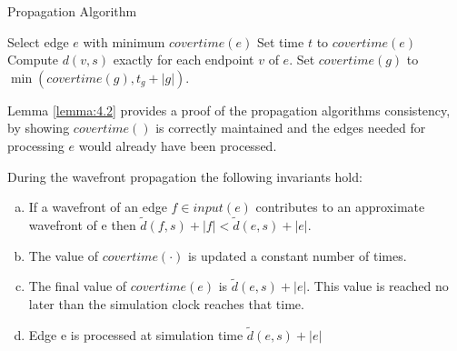 \begin{algorithm}[H]
	\caption{Propagation Algorithm} \label{algorithm:propagationalgorithm}
	\begin{algorithmic}[1]
        	\State Select edge $e$ with minimum $covertime(e)$
            \State Set time $t$ to $covertime(e)$
            \State {}
            \State Compute $d(v,s)$ exactly for each endpoint $v$ of $e$.
           		\State {}
                \State Set $covertime(g)$ to $\min(covertime(g), t_g + |g|)$.
            \EndFor
        \EndWhile
	\end{algorithmic} 
\end{algorithm}

Lemma \ref{lemma:4.2} provides a proof of the propagation algorithms consistency, by showing 
$covertime()$ is correctly maintained and the edges needed for processing $e$ would already have 
been processed. 

\begin{Lemma}\label{lemma:4.2}
During the wavefront propagation the following invariants hold:

\begin{enumerate}[(a)]
	\item If a wavefront of an edge $f \in input(e)$ contributes to an
	approximate wavefront of e then $\tilde{d}(f,s)+|f|<\tilde{d}(e,s)+|e|$.
	\item The value of $covertime(\cdot)$ is updated a constant number of times.
	\item The final value of $covertime(e)$ is $\tilde{d}(e,s)+|e|$. This value
	is reached no later than the simulation clock reaches that time.
	\item Edge e is processed at simulation time $\tilde{d}(e,s) + |e|$
	\end{enumerate}
\end{Lemma}

